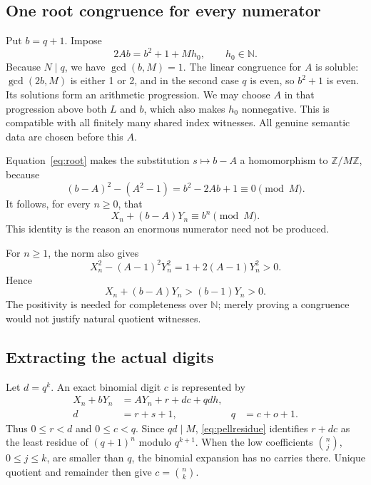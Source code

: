 \documentclass[11pt,letterpaper]{article}
\theoremstyle{remark}\newtheorem{remark}[theorem]{Remark}
\newcommand{\N}{\mathbb N}\newcommand{\Z}{\mathbb Z}
\begin{document}
\subsection{One root congruence for every numerator}

Put \(b=q+1\). Impose
\begin{equation}
 2Ab=b^2+1+Mh_0,\qquad h_0\in\N. \label{eq:root}
\end{equation}
Because \(N\mid q\), we have \(\gcd(b,M)=1\). The linear
congruence for \(A\) is soluble: \(\gcd(2b,M)\) is either 1 or 2,
and in the second case \(q\) is even, so \(b^2+1\) is even. Its
solutions form an arithmetic progression. We may choose \(A\) in that
progression above both \(L\) and \(b\), which also makes \(h_0\)
nonnegative. This is compatible with all finitely many shared index
witnesses. All genuine semantic data are chosen before this \(A\).

Equation~\eqref{eq:root} makes the substitution \(s\mapsto b-A\)
a homomorphism to \(\Z/M\Z\), because
\[
 (b-A)^2-(A^2-1)=b^2-2Ab+1\equiv0\pmod M.
\]
It follows, for every \(n\ge0\), that
\begin{equation}
 \boxed{X_n+(b-A)Y_n\equiv b^n\pmod M.} \label{eq:pellresidue}
\end{equation}
This identity is the reason an enormous numerator need not be produced.

For \(n\ge1\), the norm also gives
\[
 X_n^2-(A-1)^2Y_n^2=1+2(A-1)Y_n^2>0.
\]
Hence
\begin{equation}
 X_n+(b-A)Y_n>(b-1)Y_n>0. \label{eq:positive}
\end{equation}
The positivity is needed for completeness over \(\N\); merely proving
a congruence would not justify natural quotient witnesses.

\subsection{Extracting the actual digits}

Let \(d=q^k\). An exact binomial digit \(c\) is represented by
\begin{align}
 X_n+bY_n&=AY_n+r+dc+qd h,\nonumber\\
 d&=r+s+1,&q&=c+o+1. \label{eq:exactdigit}
\end{align}
Thus \(0\le r<d\) and \(0\le c<q\). Since \(qd\mid M\),
\eqref{eq:pellresidue} identifies \(r+dc\) as the least residue of
\((q+1)^n\) modulo \(q^{k+1}\). When the low coefficients
\(\binom nj\), \(0\le j\le k\), are smaller than \(q\), the
binomial expansion has no carries there. Unique quotient and remainder
then give \(c=\binom nk\).
\end{document}
